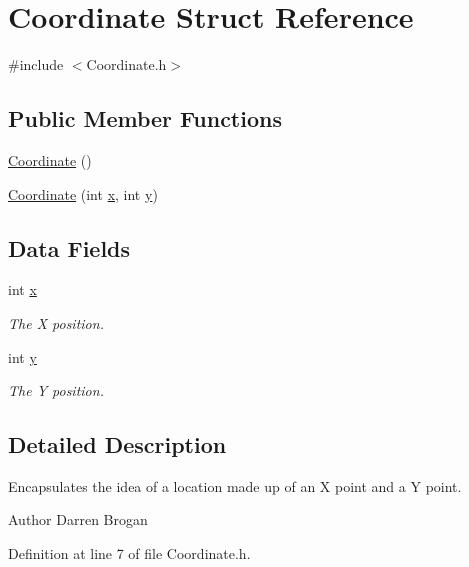 \hypertarget{structCoordinate}{\section{Coordinate Struct Reference}
\label{structCoordinate}
}


{\ttfamily \#include $<$Coordinate.\-h$>$}

\subsection*{Public Member Functions}
\begin{DoxyCompactItemize}
\item 
\hyperlink{structCoordinate_aac6f323a685fc1e88fbea9c86f1e600d}{Coordinate} ()
\item 
\hyperlink{structCoordinate_aba3fc03b1a25f335c9058ddf18290d59}{Coordinate} (int \hyperlink{structCoordinate_ad462d671f1feb865911333e3ff5f0a5d}{x}, int \hyperlink{structCoordinate_a5c7d59f0f65ff9371b6c3791f78880aa}{y})
\end{DoxyCompactItemize}
\subsection*{Data Fields}
\begin{DoxyCompactItemize}
\item 
int \hyperlink{structCoordinate_ad462d671f1feb865911333e3ff5f0a5d}{x}
\begin{DoxyCompactList}\small\item\em The X position. \end{DoxyCompactList}\item 
int \hyperlink{structCoordinate_a5c7d59f0f65ff9371b6c3791f78880aa}{y}
\begin{DoxyCompactList}\small\item\em The Y position. \end{DoxyCompactList}\end{DoxyCompactItemize}


\subsection{Detailed Description}
Encapsulates the idea of a location made up of an X point and a Y point. \begin{DoxyAuthor}{Author}
Darren Brogan 
\end{DoxyAuthor}


Definition at line 7 of file Coordinate.\-h.



